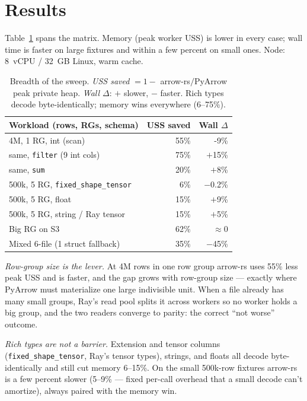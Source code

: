 \documentclass[10pt,twocolumn]{article}
\begin{document}
\section{Results}
Table~\ref{tab:results} spans the matrix. Memory (peak worker USS) is lower in every case;
wall time is faster on large fixtures and within a few percent on small ones. Node:
8~vCPU / 32~GB Linux, warm cache.

\begin{table}[t]
\centering
\small
\begin{tabular}{@{}lrr@{}}
\toprule
Workload (rows, RGs, schema) & USS saved & Wall $\Delta$ \\
\midrule
4M, 1 RG, int (scan)              & 55\% & -9\% \\
\quad same, \texttt{filter} (9 int cols) & 75\% & $+$15\% \\
\quad same, \texttt{sum}          & 20\% & $+$8\% \\
500k, 5 RG, \texttt{fixed\_shape\_tensor} & 6\%  & $-$0.2\% \\
500k, 5 RG, float                 & 15\% & $+$9\% \\
500k, 5 RG, string / Ray tensor   & 15\% & $+$5\% \\
Big RG on S3                      & 62\% & $\approx$0 \\
Mixed 6-file (1 struct fallback)  & 35\% & $-$45\% \\
\bottomrule
\end{tabular}
\caption{Breadth of the sweep. \emph{USS saved} $= 1 -$ arrow-rs$/$PyArrow peak private
heap. \emph{Wall $\Delta$}: $+$ slower, $-$ faster. Rich types decode byte-identically;
memory wins everywhere (6--75\%).}
\label{tab:results}
\end{table}

\emph{Row-group size is the lever.} At 4M rows in one row group arrow-rs uses 55\% less
peak USS and is faster, and the gap grows with row-group size --- exactly where PyArrow
must materialize one large indivisible unit. When a file already has many small groups,
Ray's read pool splits it across workers so no worker holds a big group, and the two
readers converge to parity: the correct ``not worse'' outcome.

\emph{Rich types are not a barrier.} Extension and tensor columns
(\texttt{fixed\_shape\_tensor}, Ray's tensor types), strings, and floats all decode
byte-identically and still cut memory 6--15\%. On the small 500k-row fixtures arrow-rs is
a few percent slower (5--9\% --- fixed per-call overhead that a small decode can't
amortize), always paired with the memory win.
\end{document}
